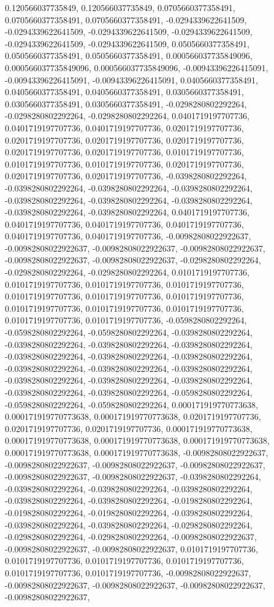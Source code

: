 \documentclass[
  ,man]{apa6}
\begin{document}
0.120566037735849, 0.120566037735849, 0.0705660377358491, 0.0705660377358491, 0.0705660377358491, -0.0294339622641509, -0.0294339622641509, -0.0294339622641509, -0.0294339622641509, -0.0294339622641509, -0.0294339622641509, 0.0505660377358491, 0.0505660377358491, 0.0505660377358491, 0.000566037735849096, 0.000566037735849096, 0.000566037735849096, -0.00943396226415091, -0.00943396226415091, -0.00943396226415091, 0.0405660377358491, 0.0405660377358491, 0.0405660377358491, 0.0305660377358491, 0.0305660377358491,
0.0305660377358491, -0.0298280802292264, -0.0298280802292264, -0.0298280802292264, 0.0401719197707736, 0.0401719197707736, 0.0401719197707736, 0.0201719197707736, 0.0201719197707736, 0.0201719197707736, 0.0201719197707736, 0.0201719197707736, 0.0201719197707736, 0.0101719197707736, 0.0101719197707736, 0.0101719197707736, 0.0201719197707736, 0.0201719197707736, 0.0201719197707736, -0.0398280802292264, -0.0398280802292264, -0.0398280802292264, -0.0398280802292264, -0.0398280802292264, -0.0398280802292264,
-0.0398280802292264, -0.0398280802292264, -0.0398280802292264, 0.0401719197707736, 0.0401719197707736, 0.0401719197707736, 0.0401719197707736, 0.0401719197707736, 0.0401719197707736, -0.00982808022922637, -0.00982808022922637, -0.00982808022922637, -0.00982808022922637, -0.00982808022922637, -0.00982808022922637, -0.0298280802292264, -0.0298280802292264, -0.0298280802292264, 0.0101719197707736, 0.0101719197707736, 0.0101719197707736, 0.0101719197707736, 0.0101719197707736, 0.0101719197707736, 0.0101719197707736,
0.0101719197707736, 0.0101719197707736, 0.0101719197707736, 0.0101719197707736, 0.0101719197707736, -0.0598280802292264, -0.0598280802292264, -0.0598280802292264, -0.0398280802292264, -0.0398280802292264, -0.0398280802292264, -0.0398280802292264, -0.0398280802292264, -0.0398280802292264, -0.0398280802292264, -0.0398280802292264, -0.0398280802292264, -0.0398280802292264, -0.0398280802292264, -0.0398280802292264, -0.0398280802292264, -0.0398280802292264, -0.0398280802292264, -0.0598280802292264, -0.0598280802292264,
-0.0598280802292264, 0.000171919770773638, 0.000171919770773638, 0.000171919770773638, 0.0201719197707736, 0.0201719197707736, 0.0201719197707736, 0.000171919770773638, 0.000171919770773638, 0.000171919770773638, 0.000171919770773638, 0.000171919770773638, 0.000171919770773638, -0.00982808022922637, -0.00982808022922637, -0.00982808022922637, -0.00982808022922637, -0.00982808022922637, -0.00982808022922637, -0.0398280802292264, -0.0398280802292264, -0.0398280802292264, -0.0398280802292264, -0.0398280802292264,
-0.0398280802292264, -0.0198280802292264, -0.0198280802292264, -0.0198280802292264, -0.0398280802292264, -0.0398280802292264, -0.0398280802292264, -0.0298280802292264, -0.0298280802292264, -0.0298280802292264, -0.00982808022922637, -0.00982808022922637, -0.00982808022922637, 0.0101719197707736, 0.0101719197707736, 0.0101719197707736, 0.0101719197707736, 0.0101719197707736, 0.0101719197707736, -0.00982808022922637, -0.00982808022922637, -0.00982808022922637, -0.00982808022922637, -0.00982808022922637,
\end{document}
